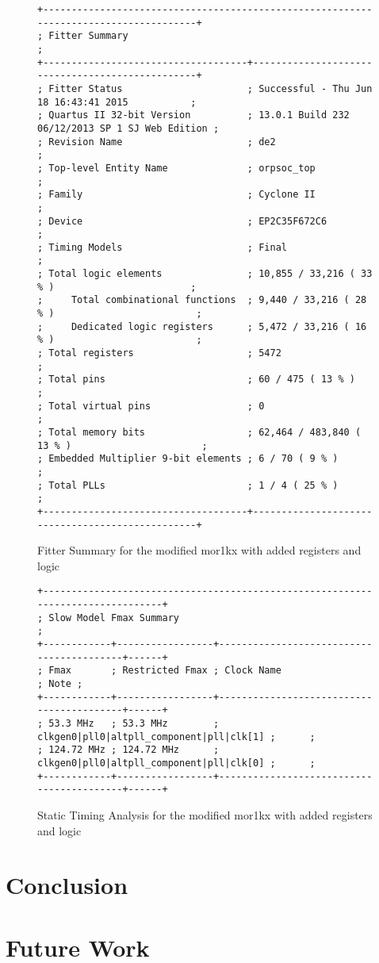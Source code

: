 \begin{figure}[t]
  \centering
  \footnotesize
  \begin{verbatim}
+--------------------------------------------------------------------------------------+
; Fitter Summary                                                                       ;
+------------------------------------+-------------------------------------------------+
; Fitter Status                      ; Successful - Thu Jun 18 16:43:41 2015           ;
; Quartus II 32-bit Version          ; 13.0.1 Build 232 06/12/2013 SP 1 SJ Web Edition ;
; Revision Name                      ; de2                                             ;
; Top-level Entity Name              ; orpsoc_top                                      ;
; Family                             ; Cyclone II                                      ;
; Device                             ; EP2C35F672C6                                    ;
; Timing Models                      ; Final                                           ;
; Total logic elements               ; 10,855 / 33,216 ( 33 % )                        ;
;     Total combinational functions  ; 9,440 / 33,216 ( 28 % )                         ;
;     Dedicated logic registers      ; 5,472 / 33,216 ( 16 % )                         ;
; Total registers                    ; 5472                                            ;
; Total pins                         ; 60 / 475 ( 13 % )                               ;
; Total virtual pins                 ; 0                                               ;
; Total memory bits                  ; 62,464 / 483,840 ( 13 % )                       ;
; Embedded Multiplier 9-bit elements ; 6 / 70 ( 9 % )                                  ;
; Total PLLs                         ; 1 / 4 ( 25 % )                                  ;
+------------------------------------+-------------------------------------------------+
  \end{verbatim}
  \caption{Fitter Summary for the modified mor1kx with added registers and logic}
  \label{fig:fit_after}
\end{figure}

\begin{figure}[t]
  \centering
  \footnotesize
  \begin{verbatim}
+--------------------------------------------------------------------------------+
; Slow Model Fmax Summary                                                        ;
+------------+-----------------+------------------------------------------+------+
; Fmax       ; Restricted Fmax ; Clock Name                               ; Note ;
+------------+-----------------+------------------------------------------+------+
; 53.3 MHz   ; 53.3 MHz        ; clkgen0|pll0|altpll_component|pll|clk[1] ;      ;
; 124.72 MHz ; 124.72 MHz      ; clkgen0|pll0|altpll_component|pll|clk[0] ;      ;
+------------+-----------------+------------------------------------------+------+
  \end{verbatim}
  \caption{Static Timing Analysis for the modified mor1kx with added registers and logic}
  \label{fig:sta_after}
\end{figure}

\section{Conclusion}
\section{Future Work}